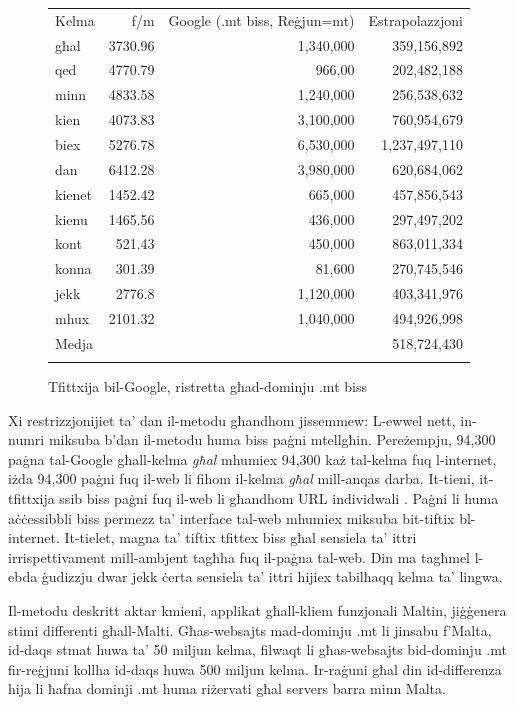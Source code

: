 \begin{multicols}{2}
\begin{figure}[p]
\setlength{\tabcolsep}{2.9em}
\begin{tabularx}{\textwidth}{lrrr} \toprule\addlinespace
Kelma & f/m & Google (.mt biss, Reġjun=mt) & Estrapolazzjoni \\ \addlinespace\midrule
għal & 3730.96 & 1,340,000 & 359,156,892 \\
qed	& 4770.79 & 966,00  &  202,482,188  \\
minn & 4833.58 & 1,240,000  &  256,538,632 \\
kien & 4073.83 & 3,100,000  &  760,954,679 \\
biex & 5276.78 & 6,530,000  & 1,237,497,110 \\
dan	& 6412.28  & 3,980,000  & 620,684,062  \\
kienet & 1452.42  & 665,000 &  457,856,543 \\
kienu & 1465.56  & 436,000  & 297,497,202  \\
kont & 521.43  & 450,000  &  863,011,334 \\
konna & 301.39  & 81,600  &   270,745,546\\
jekk & 2776.8  &  1,120,000 & 403,341,976 \\
mhux & 2101.32  & 1,040,000  &  494,926,998 \\ \addlinespace\midrule
Medja & & & 518,724,430 \\ \addlinespace\bottomrule
\end{tabularx} 
\caption{Tfittxija bil-Google, ristretta għad-dominju .mt biss}
\label{table:Google_B_mt}
\end{figure}

Xi restrizzjonijiet ta’ dan il-metodu għandhom jissemmew: L-ewwel nett, in-numri miksuba b’dan il-metodu huma biss paġni mtellgħin. Pereżempju, 94,300 paġna tal-Google għall-kelma \emph{għal} mhumiex 94,300 każ tal-kelma fuq l-internet, iżda 94,300 paġni fuq il-web li fihom il-kelma \emph{għal} mill-anqas darba. It-tieni, it-tfittxija ssib biss paġni fuq il-web li għandhom URL individwali \cite{Kilgarriff-Grefenstette:2003}. Paġni li huma aċċessibbli biss permezz ta’ interface tal-web mhumiex miksuba bit-tiftix bl-internet. It-tielet, magna ta’ tiftix tfittex biss għal sensiela ta’ ittri irrispettivament mill-ambjent tagħha fuq il-paġna tal-web. Din ma tagħmel l-ebda ġudizzju dwar jekk ċerta sensiela ta’ ittri hijiex tabilħaqq kelma ta’ lingwa.
    
Il-metodu deskritt aktar kmieni, applikat għall-kliem funzjonali Maltin, jiġġenera stimi differenti għall-Malti. Għas-websajts mad-dominju .mt li jinsabu f'Malta, id-daqs stmat huwa ta’ 50 miljun kelma, filwaqt li għas-websajts bid-dominju .mt fir-reġjuni kollha id-daqs huwa 500 miljun kelma. Ir-raġuni għal din id-differenza hija li ħafna dominji .mt huma riżervati għal servers barra minn Malta.
    

\end{multicols}
